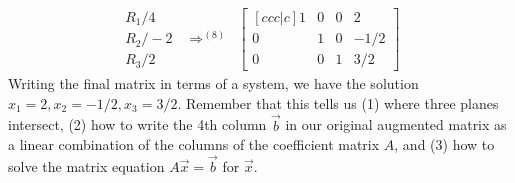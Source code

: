 \begin{example}
$$\begin{array}{rlcl}
\begin{array}{lr} R_1/4\\R_2/-2\\R_3/2 \end{array}
&\Rightarrow^{(8)}&  
\begin{bmatrix}[ccc|c] 1&0&0&2\\0&1&0&-1/2\\0&0&1&3/2\end{bmatrix} 
\end{array}
$$
Writing the final matrix in terms of a system, we have the solution {$x_1=2, x_2=-1/2, x_3=3/2$}. Remember that this tells us (1) where three planes intersect, (2) how to write the 4th column $\vec b$ in our original augmented matrix as a linear combination of the columns of the coefficient matrix $A$, and (3) how to solve the matrix equation $A\vec x = \vec b$ for $\vec x$.
\end{example}


